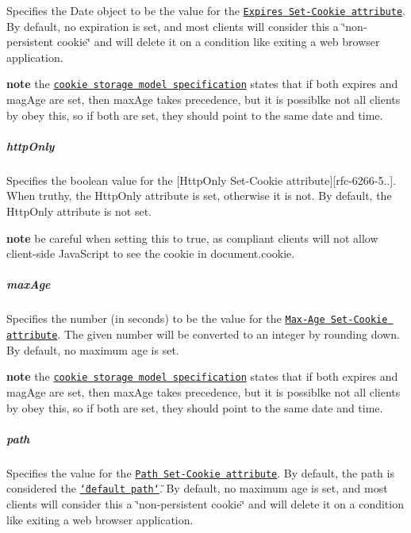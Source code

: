 Specifies the {\ttfamily Date} object to be the value for the \href{https://tools.ietf.org/html/rfc6266#section-5.2.1}{\tt {\ttfamily Expires} {\ttfamily Set-\/\+Cookie} attribute}. By default, no expiration is set, and most clients will consider this a \char`\"{}non-\/persistent cookie\char`\"{} and will delete it on a condition like exiting a web browser application.

{\bfseries note} the \href{https://tools.ietf.org/html/rfc6266#section-5.3}{\tt cookie storage model specification} states that if both {\ttfamily expires} and {\ttfamily mag\+Age} are set, then {\ttfamily max\+Age} takes precedence, but it is possiblke not all clients by obey this, so if both are set, they should point to the same date and time.

\subparagraph*{http\+Only}

Specifies the {\ttfamily boolean} value for the \mbox{[}{\ttfamily Http\+Only} {\ttfamily Set-\/\+Cookie} attribute\mbox{]}\mbox{[}rfc-\/6266-\/5..\mbox{]}. When truthy, the {\ttfamily Http\+Only} attribute is set, otherwise it is not. By default, the {\ttfamily Http\+Only} attribute is not set.

{\bfseries note} be careful when setting this to {\ttfamily true}, as compliant clients will not allow client-\/side Java\+Script to see the cookie in {\ttfamily document.\+cookie}.

\subparagraph*{max\+Age}

Specifies the {\ttfamily number} (in seconds) to be the value for the \href{https://tools.ietf.org/html/rfc6266#section-5.2.2}{\tt {\ttfamily Max-\/\+Age} {\ttfamily Set-\/\+Cookie} attribute}. The given number will be converted to an integer by rounding down. By default, no maximum age is set.

{\bfseries note} the \href{https://tools.ietf.org/html/rfc6266#section-5.3}{\tt cookie storage model specification} states that if both {\ttfamily expires} and {\ttfamily mag\+Age} are set, then {\ttfamily max\+Age} takes precedence, but it is possiblke not all clients by obey this, so if both are set, they should point to the same date and time.

\subparagraph*{path}

Specifies the value for the \href{https://tools.ietf.org/html/rfc6266#section-5.2.4}{\tt {\ttfamily Path} {\ttfamily Set-\/\+Cookie} attribute}. By default, the path is considered the \href{https://tools.ietf.org/html/rfc6266#section-5.1.4}{\tt \char`\"{}default path\char`\"{}}. By default, no maximum age is set, and most clients will consider this a \char`\"{}non-\/persistent cookie\char`\"{} and will delete it on a condition like exiting a web browser application.

